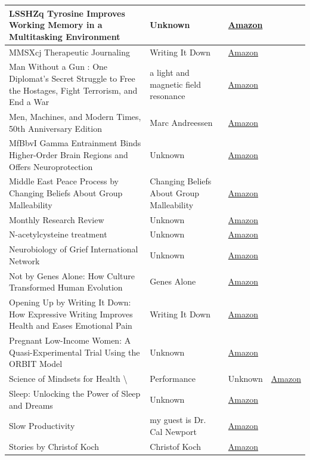 \documentclass{article}
\begin{document}
\begin{longtable}{|p{8cm}|p{4cm}|p{2.5cm}|}
\hline
LSSHZq
Tyrosine Improves Working Memory in a Multitasking Environment & Unknown & \href{https://amzn.to/3TIWfj2}{Amazon} \\
\hline
MMSXcj
Therapeutic Journaling & Writing It Down & \href{https://amzn.to/47FDnaK}{Amazon} \\
\hline
Man Without a Gun : One Diplomat's Secret Struggle to Free the Hostages, Fight Terrorism, and End a War & a light and magnetic field resonance & \href{https://amzn.to/3RfHTWv}{Amazon} \\
\hline
Men, Machines, and Modern Times, 50th Anniversary Edition & Marc Andreessen & \href{https://amzn.to/45zPmWs}{Amazon} \\
\hline
MfBbvI
Gamma Entrainment Binds Higher-Order Brain Regions and Offers Neuroprotection & Unknown & \href{https://amzn.to/3xAFVIb}{Amazon} \\
\hline
Middle East Peace Process by Changing Beliefs About Group Malleability & Changing Beliefs About Group Malleability & \href{https://amzn.to/3W1fnvI}{Amazon} \\
\hline
Monthly Research Review & Unknown & \href{https://amzn.to/3TVwNHM}{Amazon} \\
\hline
N-acetylcysteine treatment & Unknown & \href{https://amzn.to/3TUXc9Z}{Amazon} \\
\hline
Neurobiology of Grief International Network & Unknown & \href{https://amzn.to/4dEUBJ8}{Amazon} \\
\hline
Not by Genes Alone: How Culture Transformed Human Evolution & Genes Alone & \href{https://amzn.to/3QirDEZ}{Amazon} \\
\hline
Opening Up by Writing It Down: How Expressive Writing Improves Health and Eases Emotional Pain & Writing It Down & \href{https://amzn.to/47HrNMg}{Amazon} \\
\hline
Pregnant Low-Income Women: A Quasi-Experimental Trial Using the ORBIT Model & Unknown & \href{https://amzn.to/3m2dHTa}{Amazon} \\
\hline
Science of Mindsets for Health \textbackslash{}& Performance & Unknown & \href{https://amzn.to/3FCgKYk}{Amazon} \\
\hline
Sleep: Unlocking the Power of Sleep and Dreams & Unknown & \href{https://amzn.to/3bEbpVc}{Amazon} \\
\hline
Slow Productivity & my guest is Dr. Cal Newport & \href{https://amzn.to/49QzG35}{Amazon} \\
\hline
Stories by Christof Koch & Christof Koch & \href{https://amzn.to/42tLC9a}{Amazon} \\

\end{longtable}
\end{document}
